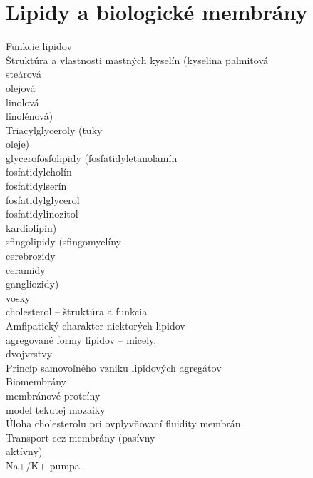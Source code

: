 \section{Lipidy a biologické membrány}
Funkcie lipidov\\
Štruktúra a vlastnosti mastných kyselín (kyselina palmitová\\
\tab steárová\\
\tab olejová\\
\tab linolová\\
\tab linolénová)\\
Triacylglyceroly (tuky\\
\tab oleje)\\
\tab glycerofosfolipidy (fosfatidyletanolamín\\
\tab fosfatidylcholín\\
\tab fosfatidylserín\\
\tab fosfatidylglycerol\\
\tab fosfatidylinozitol\\
\tab kardiolipín)\\
\tab sfingolipidy (sfingomyelíny\\
\tab cerebrozidy\\
\tab ceramidy\\
\tab gangliozidy)\\
\tab vosky\\
\tab cholesterol -- štruktúra a funkcia\\
Amfipatický charakter niektorých lipidov\\
\tab agregované formy lipidov -- micely,\\
dvojvrstvy\\
Princíp samovoľného vzniku lipidových agregátov\\
Biomembrány\\
\tab membránové proteíny\\
\tab model tekutej mozaiky\\
Úloha cholesterolu pri ovplyvňovaní fluidity membrán\\
Transport cez membrány (pasívny\\
\tab aktívny)\\
Na+/K+ pumpa.\\
\\
